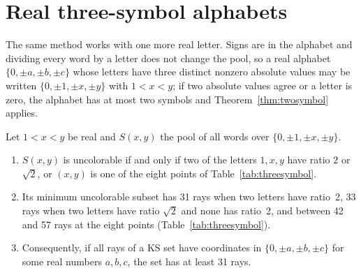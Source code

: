 \section{Real three-symbol alphabets}\label{sec:threesymbol}

The same method works with one more real letter.  Signs are in the alphabet and dividing every
word by a letter does not change the pool, so a real alphabet $\{0,\pm a,\pm b,\pm c\}$ whose
letters have three distinct nonzero absolute values may be written $\{0,\pm1,\pm x,\pm y\}$ with
$1<x<y$; if two absolute values agree or a letter is zero, the alphabet has at most two symbols and
Theorem~\ref{thm:twosymbol} applies.

\begin{theorem}\label{thm:threesymbol}
Let $1<x<y$ be real and $S(x,y)$ the pool of all words over $\{0,\pm1,\pm x,\pm y\}$.
\begin{enumerate}[label=(\roman*)]
\item $S(x,y)$ is uncolorable if and only if two of the letters $1,x,y$ have ratio $2$ or
$\sqrt2$, or $(x,y)$ is one of the eight points of Table~\ref{tab:threesymbol}.
\item Its minimum uncolorable subset has 31 rays when two letters have ratio~2, 33 rays when two
letters have ratio $\sqrt2$ and none has ratio~2, and between 42 and 57 rays at the eight points
(Table~\ref{tab:threesymbol}).
\item Consequently, if all rays of a KS set have coordinates in $\{0,\pm a,\pm b,\pm c\}$ for some
real numbers $a,b,c$, the set has at least 31 rays.
\end{enumerate}
\end{theorem}

